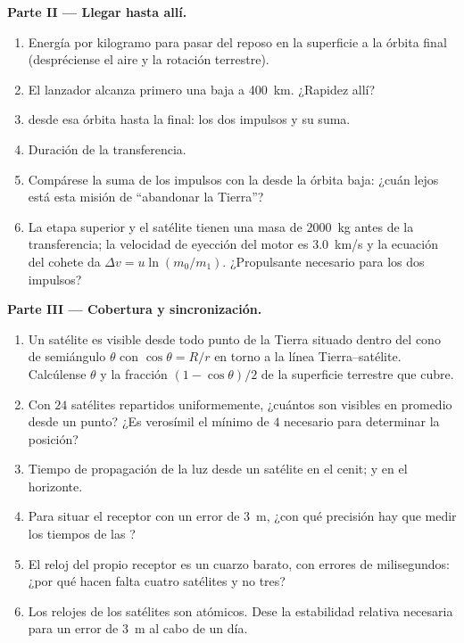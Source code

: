 \begin{problem}
\medskip
\noindent\textbf{Parte II --- Llegar hasta allí.}
\begin{enumerate}[resume]
  \item Energía por kilogramo para pasar del reposo en la superficie a la
        órbita final (despréciense el aire y la rotación terrestre).
  \item El lanzador alcanza primero una  baja a
        \qty{400}{km}. ¿Rapidez allí?
  \item {} desde esa órbita hasta la final: los dos
        impulsos y su suma.
  \item Duración de la transferencia.
  \item Compárese la suma de los impulsos con la  desde
        la órbita baja: ¿cuán lejos está esta misión de ``abandonar la Tierra''?
  \item La etapa superior y el satélite tienen una masa de \qty{2000}{kg}
        antes de la transferencia; la velocidad de eyección del motor es
        \qty{3.0}{km/s} y la ecuación del cohete da $\Delta v = u\ln(m_0/m_1)$.
        ¿Propulsante necesario para los dos impulsos?
\end{enumerate}

\medskip
\noindent\textbf{Parte III --- Cobertura y sincronización.}
\begin{enumerate}[resume]
  \item Un satélite es visible desde todo punto de la Tierra situado
        dentro del cono de semiángulo $\theta$ con $\cos\theta = R/r$ en
        torno a la línea Tierra--satélite. Calcúlense $\theta$ y la
        fracción $(1 - \cos\theta)/2$ de la superficie terrestre que cubre.
  \item Con $24$ satélites repartidos uniformemente, ¿cuántos son visibles
        en promedio desde un punto? ¿Es verosímil el mínimo de $4$
        necesario para determinar la posición?
  \item Tiempo de propagación de la luz desde un satélite en el cenit; y
        en el horizonte.
  \item Para situar el receptor con un error de \qty{3}{m}, ¿con qué
        precisión hay que medir los tiempos de las ?
  \item El reloj del propio receptor es un cuarzo barato, con errores de
        milisegundos: ¿por qué hacen falta cuatro satélites y no tres?
  \item Los relojes de los satélites son atómicos. Dese la estabilidad
        relativa necesaria para un error de \qty{3}{m} al cabo de un día.
\end{enumerate}


\end{problem}
